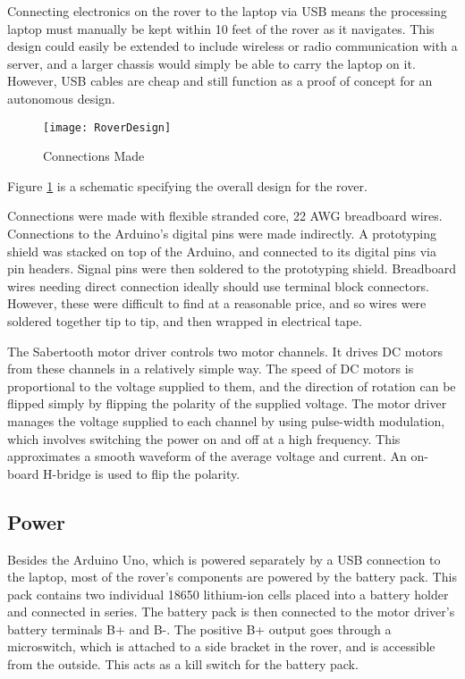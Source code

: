 Connecting electronics on the rover to the laptop via USB means the processing laptop must manually be kept within 10 feet of the rover as it navigates. This design could easily be extended to include wireless or radio communication with a server, and a larger chassis would simply be able to carry the laptop on it. However, USB cables are cheap and still function as a proof of concept for an autonomous design.

\begin{figure}[p] 
	\caption{Connections Made}
	\texttt{[image: RoverDesign]}
	\centering
	\label{figRoverDesign}
\end{figure}

Figure \ref{figRoverDesign} is a schematic specifying the overall design for the rover.

Connections were made with flexible stranded core, 22 AWG breadboard wires. Connections to the Arduino's digital pins were made indirectly. A prototyping shield was stacked on top of the Arduino, and connected to its digital pins via pin headers. Signal pins were then soldered to the prototyping shield. Breadboard wires needing direct connection ideally should use terminal block connectors. However, these were difficult to find at a reasonable price, and so wires were soldered together tip to tip, and then wrapped in electrical tape.

The Sabertooth motor driver controls two motor channels. It drives DC motors from these channels in a relatively simple way. The speed of DC motors is proportional to the voltage supplied to them, and the direction of rotation can be flipped simply by flipping the polarity of the supplied voltage. The motor driver manages the voltage supplied to each channel by using pulse-width modulation, which involves switching the power on and off at a high frequency. This approximates a smooth waveform of the average voltage and current. An on-board H-bridge is used to flip the polarity. \cite{dcMotorBlog}


\subsection{Power}
Besides the Arduino Uno, which is powered separately by a USB connection to the laptop, most of the rover's components are powered by the battery pack. This pack contains two individual 18650 lithium-ion cells placed into a battery holder and connected in series. The battery pack is then connected to the motor driver's battery terminals B+ and B-. The positive B+ output goes through a microswitch, which is attached to a side bracket in the rover, and is accessible from the outside. This acts as a kill switch for the battery pack.

